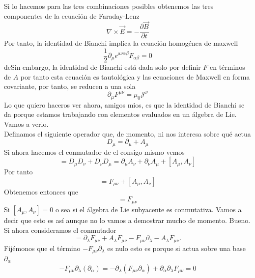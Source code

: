 \documentclass[12pt]{article}
\begin{document}
Si lo hacemos para las tres combinaciones posibles obtenemos las tres componentes de la ecuación de Faraday-Lenz
\begin{equation}
    \nabla \times \vec E =-\frac{\partial \vec B}{\partial t}
\end{equation}
Por tanto, la identidad de Bianchi implica la ecuación homogénea de maxwell 
 \begin{equation}
        \frac{1}{2}\partial_\mu \epsilon^{\mu \nu \alpha \beta} F_{\alpha \beta}= 0
\end{equation}
deSin embargo, la identidad de Bianchi está dada solo por definir $F$ en términos de $A$ por tanto esta ecuación es tautológica y las ecuaciones de Maxwell en forma covariante, por tanto, se reducen a una sola
\begin{equation}
        \partial_\mu F^{\mu \nu}=\mu_0 \mathcal{J}^\nu  
\end{equation}
Lo que quiero haceros ver ahora, amigos mios, es que la identidad de Bianchi se da porque estamos trabajando con elementos evaluados en un álgebra de Lie. Vamos a verlo.\\
Definamos el siguiente operador que, de momento, ni nos interesa sobre qué actua 
\begin{equation}
    D_\mu =\partial_\mu +A_\mu 
\end{equation}
Si ahora hacemos el conmutador de el consigo mismo vemos
\begin{equation}
    [D_\mu, D_\nu]=D_\mu D_\nu +D_\nu D_\mu = \partial_\mu A_\nu +\partial_\nu A_\mu +[A_\mu, A_\nu]
\end{equation}
Por tanto
\begin{equation}
    [D_\mu ,D_\nu]=F_{\mu \nu}+[A_\mu,A_\nu]
\end{equation}
Obtenemos entonces que
\begin{equation}
    [D_\mu, D_\nu] = F_{\mu \nu} 
\end{equation}
Si $[A_\mu,A_\nu]=0$ o sea si el álgebra de Lie subyacente es conmutativa.  Vamos a decir que esto es así aunque no lo vamos a demostrar mucho de momento. Bueno. Si ahora consideramos el conmutador
\begin{equation}
    [D_\lambda, F_{\mu\nu}]=\partial_\lambda F_{\mu \nu} + A_\lambda F_{\mu \nu} -F_{\mu \nu}\partial_\lambda -A_\lambda F_{\mu \nu}.
\end{equation}
Fijémonos que el término $-F_{\mu\nu} \partial_\lambda$ es nulo esto es porque si actua sobre una base $\partial_\alpha$
\begin{equation}
    -F_{\mu\nu} \partial_\lambda (\partial_\alpha) =-\partial_\lambda(F_{\mu\nu} \partial_\alpha)+\partial_\alpha\partial_\lambda F_{\mu\nu} = 0
\end{equation}
\end{document}
